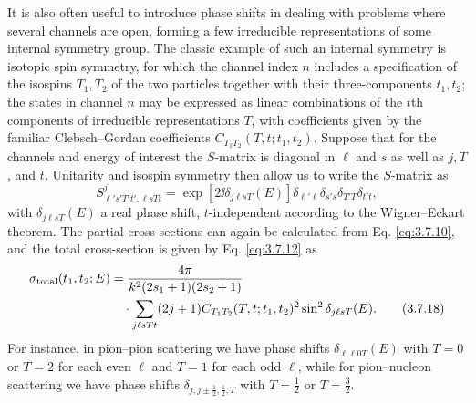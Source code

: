 It is also often useful to introduce phase shifts in dealing with problems
where several channels are open, forming a few irreducible representations of
some internal symmetry group. The classic example of such an internal
symmetry is isotopic spin symmetry, for which the channel index $n$ includes a
specification of the isospins $T_1,T_2$ of the two particles together with
their three-components $t_1,t_2$; the states in channel $n$ may be expressed
as linear combinations of the $t$th components of irreducible representations
$T$, with coefficients given by the familiar Clebsch--Gordan coefficients
$C_{T_1T_2}(T,t;t_1,t_2)$. Suppose that for the channels and energy of
interest the $S$-matrix is diagonal in $\ell$ and $s$ as well as $j,T$, and
$t$. Unitarity and isospin symmetry then allow us to write the $S$-matrix as
\begin{equation}
  S^j_{\ell's'T't',\ell sTt}
  =\exp[2\ii\delta_{j\ell sT}(E)]
    \delta_{\ell'\ell}\delta_{s's}\delta_{T'T}\delta_{t't},
  \tag{3.7.17}\label{eq:3.7.17}
\end{equation}
with $\delta_{j\ell sT}(E)$ a real phase shift, $t$-independent according to
the Wigner--Eckart theorem. The partial cross-sections can again be calculated
from Eq. \eqref{eq:3.7.10}, and the total cross-section is given by Eq. \eqref{eq:3.7.12} as
\begin{align}
  \sigma_{\rm total}(t_1,t_2;E)
  &=\frac{4\pi}{k^2(2s_1+1)(2s_2+1)} \notag\\
  &\quad\cdot\sum_{j\ell sTt}(2j+1)
    C_{T_1T_2}(T,t;t_1,t_2)^2\sin^2\delta_{j\ell sT}(E).
  \tag{3.7.18}\label{eq:3.7.18}
\end{align}
For instance, in pion--pion scattering we have phase shifts
$\delta_{\ell\ell0T}(E)$ with $T=0$ or $T=2$ for each even $\ell$ and $T=1$
for each odd $\ell$, while for pion--nucleon scattering we have phase shifts
$\delta_{j,j\pm\frac12,\frac12,T}$ with $T=\tfrac12$ or $T=\tfrac32$.

